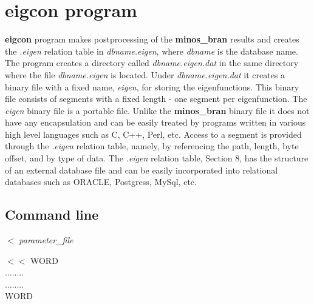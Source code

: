 \section{eigcon program}

{\bf eigcon} program makes postprocessing of the {\bf minos\_bran} results and
creates the {\it .eigen} relation table in {\it dbname.eigen},
where {\it dbname} is the database name. 
The program creates a directory called {\it dbname.eigen.dat} in the same directory
where the file {\it dbname.eigen} is located. Under {\it dbname.eigen.dat}
it creates a binary file with a fixed name, {\it eigen}, for storing
the eigenfunctions. This binary file consists of segments with a
fixed length - one segment per eigenfunction.
The {\it eigen} binary file is a portable file. Unlike
the {\bf minos\_bran} binary file it does not have any encapsulation and
can be
easily treated by programs written in various high level languages 
such as C, C++, Perl, etc.
Access to a segment is provided through the {\it .eigen} relation table, namely,
by referencing the path, length,  byte offset, and by type of data. 
The {\it .eigen}
relation table, Section 8, has the structure of an external database file
and can be easily incorporated into relational databases such as
ORACLE, Postgress, MySql, etc.

\subsection {Command line}


 $<$ {\it parameter\_file}

 $<<$ WORD \\
\noindent ........  \\
\noindent ........  \\
\noindent WORD

